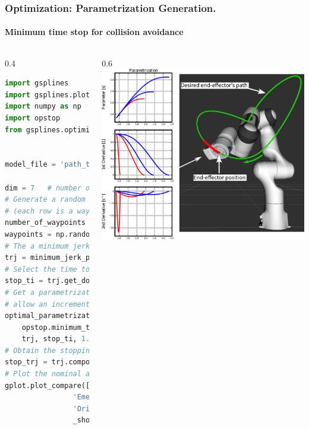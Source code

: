 \begin{frame}[fragile]
	\frametitle{Optimization: Parametrization Generation.}
	\framesubtitle{Minimum time stop for collision avoidance}
	\begin{columns}
		\begin{column}{0.4\textwidth}
			\begin{lstlisting}[language=python,
            ]
import gsplines
import gsplines.plot as gplot
import numpy as np
import opstop
from gsplines.optimization import minimum_jerk_path


model_file = 'path_to_urdf_robot_description'

dim = 7   # number of joints of the robot
# Generate a random numpy array of wayponts
# (each row is a waypoint in R^n)
number_of_waypoints = 5
waypoints = np.random.rand(number_of_waypoints, dim)
# The a minimum jerk trajectory with execution time of 5s
trj = minimum_jerk_path(waypoints)
# Select the time to stop as the 60% of the time.
stop_ti = trj.get_domain()[1]*0.6
# Get a parametrization that minimizes the time and  does not
# allow an increment in the acceleration larger than 50%
optimal_parametrization = \
    opstop.minimum_time_bounded_acceleration(
    trj, stop_ti, 1.5, str(model_file), 8)
# Obtain the stopping trajectory
stop_trj = trj.compose(optimal_parametrization)
# Plot the nominal and the stopping trajectory
gplot.plot_compare([stop_trj, trj], ['red', 'blue'], [
                'Emergency Stop Trajectory',
                'Original Trajectory'], 
                _show=True, _up_to_deriv=2)
    \end{lstlisting}
		\end{column}
		\begin{column}{0.6\textwidth}
			\includegraphics[width=\textwidth]{./images/opstop_param.pdf}
		\end{column}
	\end{columns}
\end{frame}

